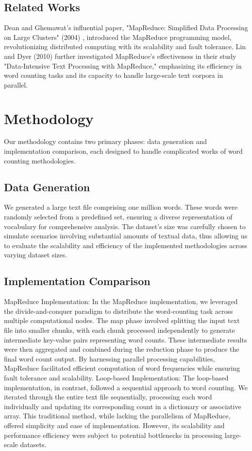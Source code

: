 \documentclass[]{acmsiggraph}
\begin{document}
\subsection{Related Works}
Dean and Ghemawat's influential paper, "MapReduce: Simplified Data Processing on Large Clusters" (2004) \cite{jeff2004}, introduced the MapReduce programming model, revolutionizing distributed computing with its scalability and fault tolerance. Lin and Dyer (2010) \cite{lin2010} further investigated MapReduce's effectiveness in their study "Data-Intensive Text Processing with MapReduce," emphasizing its efficiency in word counting tasks and its capacity to handle large-scale text corpora in parallel.

\section{Methodology}
Our methodology contains two primary phases: data generation and implementation comparison, each designed to handle complicated works of word counting methodologies.

\subsection{Data Generation}
We generated a large text file comprising one million words. These words were randomly selected from a predefined set, ensuring a diverse representation of vocabulary for comprehensive analysis. The dataset's size was carefully chosen to simulate scenarios involving substantial amounts of textual data, thus allowing us to evaluate the scalability and efficiency of the implemented methodologies across varying dataset sizes.
\subsection{Implementation Comparison}
MapReduce Implementation:
In the MapReduce implementation, we leveraged the divide-and-conquer paradigm to distribute the word-counting task across multiple computational nodes. The map phase involved splitting the input text file into smaller chunks, with each chunk processed independently to generate intermediate key-value pairs representing word counts. These intermediate results were then aggregated and combined during the reduction phase to produce the final word count output. By harnessing parallel processing capabilities, MapReduce facilitated efficient computation of word frequencies while ensuring fault tolerance and scalability.
Loop-based Implementation:
The loop-based implementation, in contrast, followed a sequential approach to word counting. We iterated through the entire text file sequentially, processing each word individually and updating its corresponding count in a dictionary or associative array. This traditional method, while lacking the parallelism of MapReduce, offered simplicity and ease of implementation. However, its scalability and performance efficiency were subject to potential bottlenecks in processing large-scale datasets.
\end{document}
